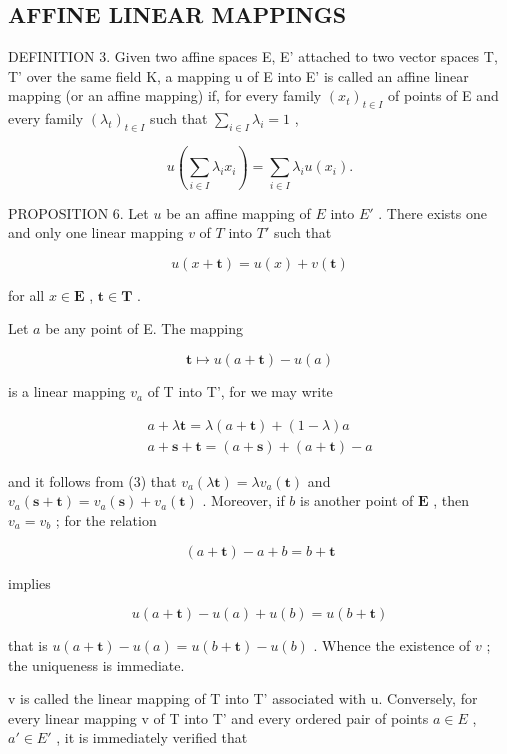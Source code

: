 \subsection{AFFINE LINEAR MAPPINGS}

DEFINITION 3. Given two affine spaces E, E' attached to two vector spaces T, T' over the same field K, a mapping u of E into E' is called an affine linear mapping (or an affine mapping) if, for every family \((x_{t})_{t\in I}\) of points of E and every family \((\lambda_{t})_{t\in I}\) such that \(\sum_{i\in I}\lambda_{i}=1\) ,

\[
u \left(\sum_ {i \in I} \lambda_ {i} x _ {i}\right) = \sum_ {i \in I} \lambda_ {i} u (x _ {i}).\tag{3}
\]

PROPOSITION 6. Let \(u\) be an affine mapping of \(E\) into \(E'\) . There exists one and only one linear mapping \(v\) of \(T\) into \(T'\) such that

\[
u (x + \mathbf {t}) = u (x) + v (\mathbf {t})
\]

for all \(x \in \mathbf{E}\) , \(\mathbf{t} \in \mathbf{T}\) .

Let \(a\) be any point of E. The mapping

\[
\mathbf {t} \mapsto u (a + \mathbf {t}) - u (a)
\]

is a linear mapping \(v_{a}\) of T into T', for we may write

\[
\begin{array}{c} a + \lambda \mathbf {t} = \lambda (a + \mathbf {t}) + (1 - \lambda) a \\ a + \mathbf {s} + \mathbf {t} = (a + \mathbf {s}) + (a + \mathbf {t}) - a \end{array}
\]

and it follows from (3) that \(v_{a}(\lambda \mathbf{t}) = \lambda v_{a}(\mathbf{t})\) and \(v_{a}(\mathbf{s} + \mathbf{t}) = v_{a}(\mathbf{s}) + v_{a}(\mathbf{t})\) . Moreover, if \(b\) is another point of \(\mathbf{E}\) , then \(v_{a} = v_{b}\) ; for the relation

\[
(a + \mathbf {t}) - a + b = b + \mathbf {t}
\]

implies

\[
u (a + \mathbf {t}) - u (a) + u (b) = u (b + \mathbf {t})
\]

that is \(u(a + \mathbf{t}) - u(a) = u(b + \mathbf{t}) - u(b)\) . Whence the existence of \(v\) ; the uniqueness is immediate.

v is called the linear mapping of T into T' associated with u. Conversely, for every linear mapping v of T into T' and every ordered pair of points \(a \in E\) , \(a' \in E'\) , it is immediately verified that

